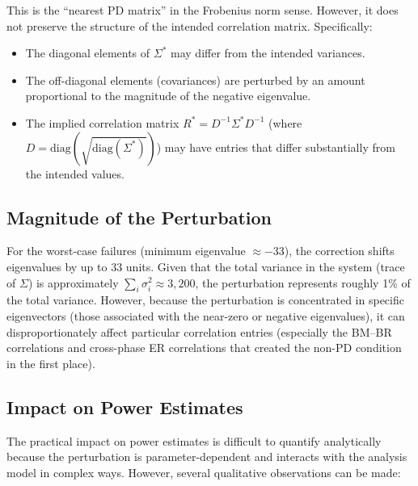 \documentclass[11pt]{article}
\begin{document}
This is the ``nearest PD matrix'' in the Frobenius norm sense.
However, it does not preserve the structure of the intended
correlation matrix. Specifically:

\begin{itemize}
\item The diagonal elements of $\Sigma^*$ may differ from the
  intended variances.
\item The off-diagonal elements (covariances) are perturbed
  by an amount proportional to the magnitude of the negative
  eigenvalue.
\item The implied correlation matrix
  $R^* = D^{-1} \Sigma^* D^{-1}$ (where
  $D = \text{diag}(\sqrt{\text{diag}(\Sigma^*)})$) may have
  entries that differ substantially from the intended values.
\end{itemize}

\subsection{Magnitude of the Perturbation}

For the worst-case failures (minimum eigenvalue $\approx -33$),
the correction shifts eigenvalues by up to 33 units. Given that
the total variance in the system (trace of $\Sigma$) is
approximately $\sum_i \sigma_i^2 \approx 3{,}200$, the
perturbation represents roughly 1\% of the total variance.
However, because the perturbation is concentrated in specific
eigenvectors (those associated with the near-zero or negative
eigenvalues), it can disproportionately affect particular
correlation entries (especially the BM--BR correlations and
cross-phase ER correlations that created the non-PD condition
in the first place).

\subsection{Impact on Power Estimates}

The practical impact on power estimates is difficult to quantify
analytically because the perturbation is parameter-dependent and
interacts with the analysis model in complex ways. However,
several qualitative observations can be made:
\end{document}
